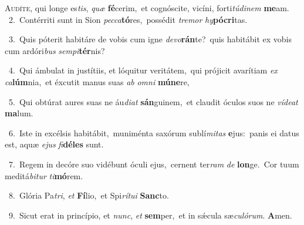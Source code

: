 \lettrine{\initial\textcolor{\initialcolor}{A}}{udíte,} qui longe es\-\textit{tis}\-, \textit{quæ} \textbf{fé}\-cerim,~\star et cognóscite, vicíni, forti\-\textit{tú}\-\textit{di}\textit{nem} \textbf{me}\-am.\\
{\numbfont\textcolor{\numbcolor}{~2.}}~Contérriti sunt in Sion \textit{pec}\-\textit{ca}\textbf{tó}res,~\star possédit \textit{tre}\-\textit{mor} \textit{hy}\-\textbf{pó}\textbf{cri}tas.\par
{\numbfont\textcolor{\numbcolor}{~3.}}~Quis póterit habitáre de vobis cum igne \textit{de}\-\textit{vo}\textbf{rán}te?~\star quis habitábit ex vobis cum ardóri\textit{bus} \textit{sem}\-\textit{pi}\textbf{tér}nis?\par
{\numbfont\textcolor{\numbcolor}{~4.}}~Qui ámbulat in justítiis, et lóquitur veritátem,~\dagger qui prójicit avarítiam \textit{ex} \textit{ca}\-\textbf{lúm}nia,~\star et éxcutit manus suas \textit{ab} \textit{om}\-\textit{ni} \textbf{mú}\-\textbf{ne}re,\par
{\numbfont\textcolor{\numbcolor}{~5.}}~Qui obtúrat aures suas ne áu\-\textit{di}\-\textit{at} \textbf{sán}\-guinem,~\star et claudit óculos suos ne \textit{ví}\-\textit{de}\textit{at} \textbf{ma}\-lum.\par
{\numbfont\textcolor{\numbcolor}{~6.}}~Iste in excélsis habitábit,~\dagger muniménta saxórum sublí\-\textit{mi}\-\textit{tas} \textbf{e}\-jus:~\star panis ei datus est, aquæ \textit{e}\-\textit{jus} \textit{fi}\-\textbf{dé}\textbf{les} sunt.\par
{\numbfont\textcolor{\numbcolor}{~7.}}~Regem in decóre suo vidébunt óculi ejus,~\dagger cernent ter\textit{ram} \textit{de} \textbf{lon}\-ge.~\star Cor tuum meditá\-\textit{bi}\-\textit{tur} \textit{ti}\-\textbf{mó}rem.\par
{\numbfont\textcolor{\numbcolor}{~8.}}~Glória Pa\-\textit{tri}\-, \textit{et} \textbf{Fí}\-lio,~\star et Spi\-\textit{rí}\-\textit{tu}\textit{i} \textbf{Sanc}\-to.\par
{\numbfont\textcolor{\numbcolor}{~9.}}~Sicut erat in princípio, et \textit{nunc}\-, \textit{et} \textbf{sem}\-per,~\star et in sǽcula sæ\-\textit{cu}\-\textit{ló}\textit{rum}. \textbf{A}\-men.\par
